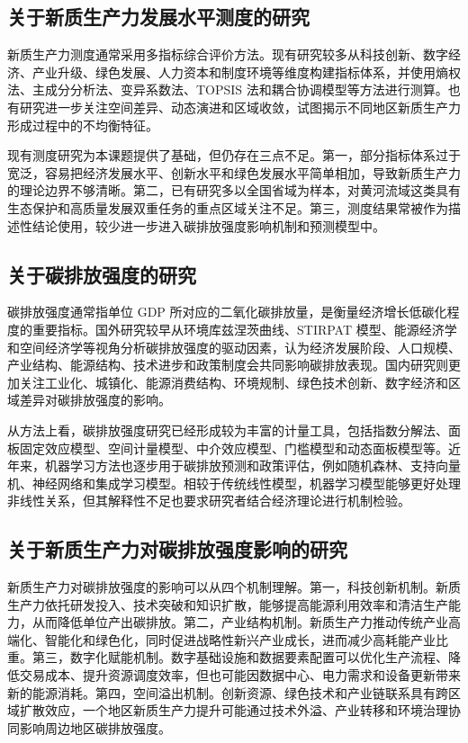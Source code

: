 \documentclass[UTF8,a4paper,zihao=-4,fontset=windows]{ctexart}
\begin{document}
\subsection{关于新质生产力发展水平测度的研究}

新质生产力测度通常采用多指标综合评价方法。现有研究较多从科技创新、数字经济、产业升级、绿色发展、人力资本和制度环境等维度构建指标体系，并使用熵权法、主成分分析法、变异系数法、TOPSIS 法和耦合协调模型等方法进行测算。也有研究进一步关注空间差异、动态演进和区域收敛，试图揭示不同地区新质生产力形成过程中的不均衡特征。

现有测度研究为本课题提供了基础，但仍存在三点不足。第一，部分指标体系过于宽泛，容易把经济发展水平、创新水平和绿色发展水平简单相加，导致新质生产力的理论边界不够清晰。第二，已有研究多以全国省域为样本，对黄河流域这类具有生态保护和高质量发展双重任务的重点区域关注不足。第三，测度结果常被作为描述性结论使用，较少进一步进入碳排放强度影响机制和预测模型中。

\subsection{关于碳排放强度的研究}

碳排放强度通常指单位 GDP 所对应的二氧化碳排放量，是衡量经济增长低碳化程度的重要指标。国外研究较早从环境库兹涅茨曲线、STIRPAT 模型、能源经济学和空间经济学等视角分析碳排放强度的驱动因素，认为经济发展阶段、人口规模、产业结构、能源结构、技术进步和政策制度会共同影响碳排放表现。国内研究则更加关注工业化、城镇化、能源消费结构、环境规制、绿色技术创新、数字经济和区域差异对碳排放强度的影响。

从方法上看，碳排放强度研究已经形成较为丰富的计量工具，包括指数分解法、面板固定效应模型、空间计量模型、中介效应模型、门槛模型和动态面板模型等。近年来，机器学习方法也逐步用于碳排放预测和政策评估，例如随机森林、支持向量机、神经网络和集成学习模型。相较于传统线性模型，机器学习模型能够更好处理非线性关系，但其解释性不足也要求研究者结合经济理论进行机制检验。

\subsection{关于新质生产力对碳排放强度影响的研究}

新质生产力对碳排放强度的影响可以从四个机制理解。第一，科技创新机制。新质生产力依托研发投入、技术突破和知识扩散，能够提高能源利用效率和清洁生产能力，从而降低单位产出碳排放。第二，产业结构机制。新质生产力推动传统产业高端化、智能化和绿色化，同时促进战略性新兴产业成长，进而减少高耗能产业比重。第三，数字化赋能机制。数字基础设施和数据要素配置可以优化生产流程、降低交易成本、提升资源调度效率，但也可能因数据中心、电力需求和设备更新带来新的能源消耗。第四，空间溢出机制。创新资源、绿色技术和产业链联系具有跨区域扩散效应，一个地区新质生产力提升可能通过技术外溢、产业转移和环境治理协同影响周边地区碳排放强度。
\end{document}
